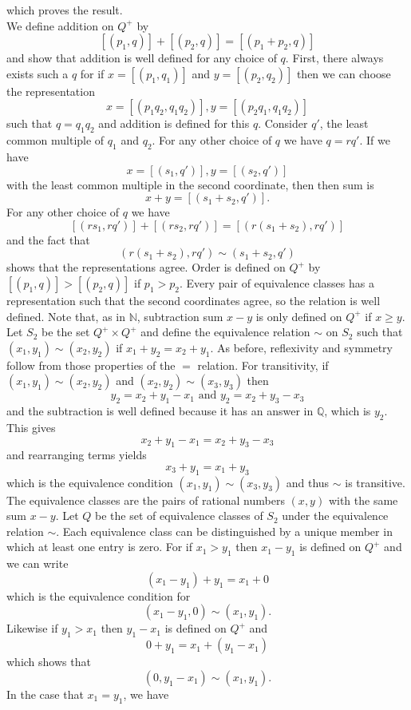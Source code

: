 \documentclass{article}
\begin{document}
which proves the result. \\
\indent We define addition on $Q^+$ by 
$$[(p_1, q)] + [(p_2, q)] = [(p_1 + p_2 , q)]$$
and show that addition is well defined for any choice of $q$. First, there always exists such a $q$ for if $x = [(p_1, q_1)]$ and $y=[(p_2, q_2)]$ then we can choose the representation
$$x = [(p_1q_2, q_1q_2)], y =[(p_2q_1, q_1q_2)]$$
such that $q = q_1q_2$ and addition is defined for this $q$. Consider $q'$, the least common multiple of $q_1$ and $q_2$. For any other choice of $q$ we have $q =r q'$. If we have
$$x = [(s_1, q')], y = [(s_2, q')]$$ 
with the least common multiple in the second coordinate, then then sum is
$$ x+ y =[(s_1 + s_2, q')].$$ 
For any other choice of $q$ we have
$$[(rs_1, rq')] + [(rs_2, rq')] = [(r(s_1 + s_2), rq')]$$
and the fact that
$$(r(s_1 +s_2), rq') \sim (s_1 + s_2, q')$$
shows that the representations agree. Order is defined on $Q^+$ by $[(p_1,q)]>[(p_2,q)]$ if $p_1 > p_2$. Every pair of equivalence classes has a representation such that the second coordinates agree, so the relation is well defined. Note that, as in $\mathbb{N}$, subtraction sum $x-y$ is only defined on $Q^+$ if $x\geq y$. \\
\indent Let $S_2$ be the set $Q^+ \times Q^+$ and define the equivalence relation $\sim$ on $S_2$ such that $(x_1, y_1) \sim (x_2, y_2)$ if $x_1 + y_2 = x_2 + y_1$. As before, reflexivity and symmetry follow from those properties of the $=$ relation. For transitivity, if $(x_1,  y_1) \sim (x_2, y_2)$ and $(x_2, y_2) \sim (x_3, y_3)$ then
$$y_2 = x_2 + y_1 - x_1 \text{ and } y_2 = x_2 + y_3 - x_3$$
and the subtraction is well defined because it has an answer in $\mathbb{Q}$, which is $y_2$. This gives 
$$x_2 + y_1 - x_1 = x_2 + y_3 - x_3$$ 
and rearranging terms yields
$$x_3 +y_1 = x_1 + y_3$$
which is the equivalence condition $(x_1, y_1) \sim (x_3, y_3)$ and thus $\sim$ is transitive.\\
\indent The equivalence classes are the pairs of rational numbers $(x, y)$ with the same sum $x-y$. Let $Q$ be the set of equivalence classes of $S_2$ under the equivalence relation $\sim$. Each equivalence class can be distinguished by a unique member in which at least one entry is zero. For if $x_1 > y_1$ then $x_1-y_1$ is defined on $Q^+$ and we can write
$$(x_1 - y_1) + y_1 = x_1 + 0$$
which is the equivalence condition for
$$(x_1 - y_1, 0) \sim (x_1, y_1).$$
Likewise if $y_1>x_1$ then $y_1-x_1$ is defined on $Q^+$ and 
$$0 + y_1 = x_1 + (y_1 - x_1)$$
which shows that
$$(0, y_1-x_1) \sim (x_1, y_1).$$
In the case that $x_1 =  y_1$, we have
\end{document}

